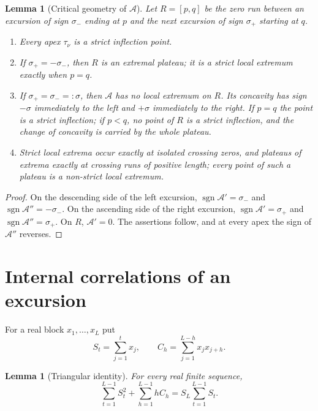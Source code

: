 \documentclass[11pt]{amsart}
\numberwithin{equation}{section}
\theoremstyle{plain}
\newtheorem{lemma}[theorem]{Lemma}
\theoremstyle{definition}
\theoremstyle{remark}
\DeclareMathOperator{\sgn}{sgn}
\newcommand{\Anet}{\mathcal{A}}
\begin{document}
\begin{lemma}[Critical geometry of $\Anet$]
\label{lem:critical}
Let $R=[p,q]$ be the zero run between an excursion of sign $\sigma_-$ ending
at $p$ and the next excursion of sign $\sigma_+$ starting at $q$.
\begin{enumerate}[label=\textup{(\roman*)}]
\item Every apex $\tau_\nu$ is a strict inflection point.
\item If $\sigma_+=-\sigma_-$, then $R$ is an extremal plateau; it is a
strict local extremum exactly when $p=q$.
\item If $\sigma_+=\sigma_-=:\sigma$, then $\Anet$ has no local extremum on
$R$. Its concavity has sign $-\sigma$ immediately to the left and $+\sigma$
immediately to the right. If $p=q$ the point is a strict inflection; if
$p<q$, no point of $R$ is a strict inflection, and the change of concavity
is carried by the whole plateau.
\item Strict local extrema occur exactly at isolated crossing zeros, and
plateaus of extrema exactly at crossing runs of positive length; every point
of such a plateau is a non-strict local extremum.
\end{enumerate}
\end{lemma}

\begin{proof}
On the descending side of the left excursion,
$\sgn\Anet'=\sigma_-$ and $\sgn\Anet''=-\sigma_-$. On the ascending side of
the right excursion, $\sgn\Anet'=\sigma_+$ and $\sgn\Anet''=\sigma_+$. On
$R$, $\Anet'=0$. The assertions follow, and at every apex the sign of
$\Anet''$ reverses.
\end{proof}

\section{Internal correlations of an excursion}
\label{sec:internal_corr}

For a real block $x_1,\dots,x_L$ put
\begin{equation}
\label{eq:block_def}
S_t=\sum_{j=1}^t x_j,\qquad
C_h=\sum_{j=1}^{L-h}x_jx_{j+h}.
\end{equation}

\begin{lemma}[Triangular identity]
\label{lem:triangular-corr}
For every real finite sequence,
\begin{equation}
\label{eq:general-triangular}
\sum_{t=1}^{L-1}S_t^2+\sum_{h=1}^{L-1}hC_h
=S_L\sum_{t=1}^{L-1}S_t.
\end{equation}
\end{lemma}
\end{document}
